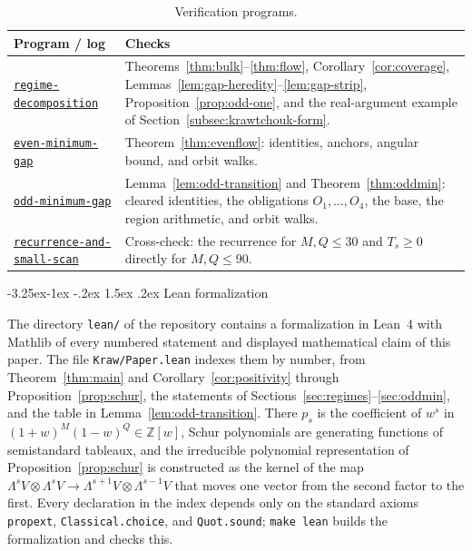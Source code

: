 \documentclass[twoside,10pt]{article}
\makeatletter
\numberwithin{equation}{section}
\theoremstyle{slbody}
\theoremstyle{definition}
\theoremstyle{remark}
\numberwithin{theorem}{section}
\newcommand{\loglink}[1]{%
  \href{https://github.com/skypher/kraw/blob/v2.0.3/certificates/#1.txt}{\texttt{#1}}}
\renewcommand{\subsection}{%
  \@startsection{subsection}{2}{\z@}%
    {-3.25ex\@plus -1ex \@minus -.2ex}%
    {1.5ex \@plus .2ex}%
    {\normalfont\normalsize\bfseries}}
\makeatother
\begin{document}
\begin{table}[H]
\centering
\small
\renewcommand{\arraystretch}{1.1}
\begin{tabular}{@{}>{\raggedright\arraybackslash}p{}>{\raggedright\arraybackslash}p{}@{}}
\toprule
Program / log & Checks \\
\midrule
\loglink{regime-decomposition} &
  Theorems~\ref{thm:bulk}--\ref{thm:flow}, Corollary~\ref{cor:coverage},
  Lemmas~\ref{lem:gap-heredity}--\ref{lem:gap-strip},
  Proposition~\ref{prop:odd-one}, and the real-argument example of
  Section~\ref{subsec:krawtchouk-form}. \\
\addlinespace[3pt]
\loglink{even-minimum-gap} &
  Theorem~\ref{thm:evenflow}: identities, anchors, angular bound, and
  orbit walks. \\
\addlinespace[3pt]
\loglink{odd-minimum-gap} &
  Lemma~\ref{lem:odd-transition} and Theorem~\ref{thm:oddmin}: cleared
  identities, the obligations $O_1,\dots,O_4$, the base, the region
  arithmetic, and orbit walks. \\
\addlinespace[3pt]
\loglink{recurrence-and-small-scan} &
  Cross-check: the recurrence for $M,Q\le30$ and $T_s\ge0$ directly for
  $M,Q\le90$. \\
\bottomrule
\end{tabular}
\medskip
\caption{Verification programs.}
\label{tab:certs}
\end{table}

\subsection{Lean formalization}\label{subsec:lean}

The directory \texttt{lean/} of the repository contains a formalization in
Lean~4 with Mathlib of every numbered statement and displayed mathematical
claim of this paper.  The file \texttt{Kraw/Paper.lean} indexes them by number,
from Theorem~\ref{thm:main} and Corollary~\ref{cor:positivity} through
Proposition~\ref{prop:schur}, the statements of
Sections~\ref{sec:regimes}--\ref{sec:oddmin}, and the table in
Lemma~\ref{lem:odd-transition}.  There $p_s$ is the coefficient of $w^s$ in
$(1+w)^M(1-w)^Q\in\mathbb Z[w]$, Schur polynomials are generating functions of
semistandard tableaux, and the irreducible polynomial representation of
Proposition~\ref{prop:schur} is constructed as the kernel of the map
$\Lambda^sV\otimes\Lambda^sV\to\Lambda^{s+1}V\otimes\Lambda^{s-1}V$ that moves
one vector from the second factor to the first.  Every declaration in the
index depends only on the standard axioms \texttt{propext},
\texttt{Classical.choice}, and \texttt{Quot.sound}; \texttt{make lean} builds
the formalization and checks this.
\end{document}
